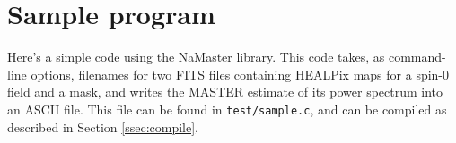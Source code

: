 \documentclass[a4paper,10pt]{article}
\begin{document}
\newpage
\section{Sample program}\label{sec:sample}

Here's a simple code using the NaMaster library. This code takes, as command-line options, filenames for two FITS files containing HEALPix maps for a spin-0 field and a mask, and writes the MASTER estimate of its power spectrum into an ASCII file. This file can be found in {\tt test/sample.c}, and can be compiled as described in Section \ref{ssec:compile}.


\end{document}

